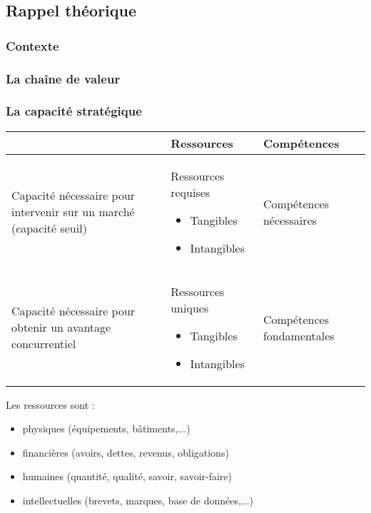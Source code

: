 \subsection{Rappel théorique}
	\subsubsection{Contexte}
	\subsubsection{La chaîne de valeur}
	\subsubsection{La capacité stratégique}
		\begin{table}[!ht]
			\begin{center}
				\begin{tabular}{p{4cm}|p{5.5cm}|p{5.5cm}}
				& Ressources & Compétences \\ \hline
				Capacité nécessaire pour intervenir sur un marché (capacité seuil) &
					Ressources requises
						\begin{itemize}
							\item Tangibles
							\item Intangibles
						\end{itemize}
						&
						Compétences nécessaires
				\\ \hline
				Capacité nécessaire pour obtenir un avantage concurrentiel
				&
				Ressources uniques
						\begin{itemize}
							\item Tangibles
							\item Intangibles
						\end{itemize}
						&
						Compétences fondamentales
				\\
				\end{tabular}
			\end{center}
		\end{table}

		Les ressources sont :
		\begin{itemize}
			\item physiques (équipements, bâtiments,...)
			\item financières (avoirs, dettes, revenus, obligations)
			\item humaines (quantité, qualité, savoir, savoir-faire)
			\item intellectuelles (brevets, marques, base de données,...)
		\end{itemize}

